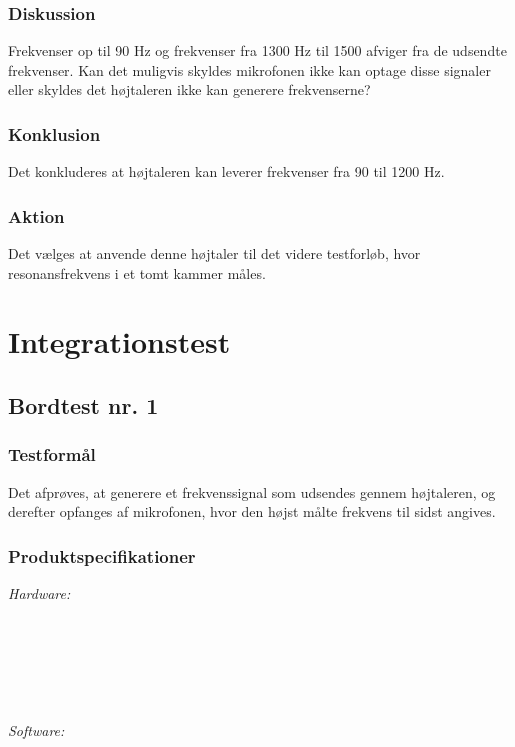 		\subsubsection{Diskussion} 
		Frekvenser op til 90 Hz og frekvenser fra 1300 Hz til 1500 afviger fra de udsendte frekvenser. Kan det muligvis skyldes mikrofonen ikke kan optage disse signaler eller skyldes det højtaleren ikke kan generere frekvenserne? 
		\subsubsection{Konklusion}
	Det konkluderes at højtaleren kan leverer frekvenser fra 90 til 1200 Hz. 
	    \subsubsection{Aktion}
	    Det vælges at anvende denne højtaler til det videre testforløb, hvor resonansfrekvens i et tomt kammer måles. 

\section{Integrationstest}

	\subsection{Bordtest nr. 1} %
	\label{bordtest1}
		\subsubsection{Testformål}
		Det afprøves, at generere et frekvenssignal som udsendes gennem højtaleren, og derefter opfanges af mikrofonen, hvor den højst målte frekvens til sidst angives.  
		\subsubsection{Produktspecifikationer}
		
		\textit{Hardware:}\\
		\\
		\\
		\pins\\
		\arduino\\
		\PC\\
		\usbkabel\\
	
		\textit{Software:}\\
		\labview\\
		\visa\\
		\vi\\
		\ardsw\
		
